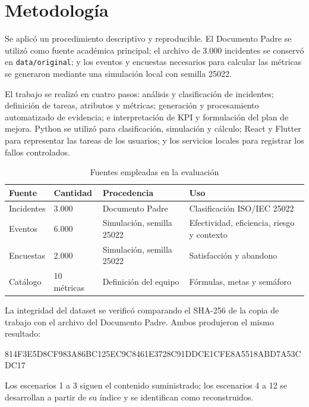 \section{Metodología}

Se aplicó un procedimiento descriptivo y reproducible. El Documento Padre se utilizó como fuente académica principal; el archivo de 3.000 incidentes se conservó en \texttt{data/original}; y los eventos y encuestas necesarios para calcular las métricas se generaron mediante una simulación local con semilla 25022.

El trabajo se realizó en cuatro pasos: análisis y clasificación de incidentes; definición de tareas, atributos y métricas; generación y procesamiento automatizado de evidencia; e interpretación de KPI y formulación del plan de mejora. Python se utilizó para clasificación, simulación y cálculo; React y Flutter para representar las tareas de los usuarios; y los servicios locales para registrar los fallos controlados.

\begin{table}[H]
\centering
\caption{Fuentes empleadas en la evaluación}
\begin{tabularx}{\textwidth}{p{3cm}p{2.2cm}YY}
\toprule
Fuente & Cantidad & Procedencia & Uso \\
\midrule
Incidentes & 3.000 & Documento Padre & Clasificación ISO/IEC 25022 \\
Eventos & 6.000 & Simulación, semilla 25022 & Efectividad, eficiencia, riesgo y contexto \\
Encuestas & 2.000 & Simulación, semilla 25022 & Satisfacción y abandono \\
Catálogo & 10 métricas & Definición del equipo & Fórmulas, metas y semáforo \\
\bottomrule
\end{tabularx}
\end{table}

La integridad del dataset se verificó comparando el SHA-256 de la copia de trabajo con el archivo del Documento Padre. Ambos produjeron el mismo resultado:

\begin{center}
\footnotesize\ttfamily
814F3E5D8CF983A86BC125EC9C8461E3728C91DDCE1CFE8A5518ABD7A53CDC17
\end{center}

Los escenarios 1 a 3 siguen el contenido suministrado; los escenarios 4 a 12 se desarrollan a partir de su índice y se identifican como reconstruidos.
